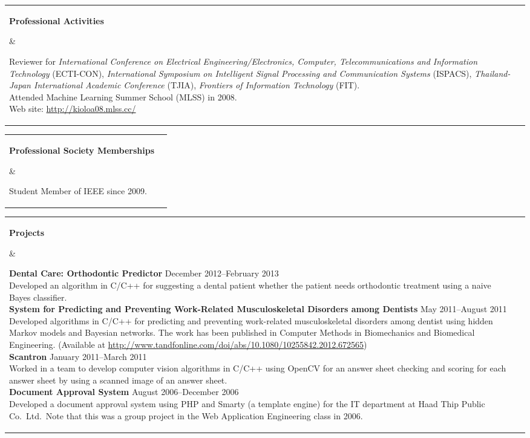 \documentclass[11pt]{article}
\makeatletter
\newcommand{\mysection}[2]{
   \noindent
   \begin{tabular}{@{}ll@{}}
   \parbox[t]{1.0in}{ \raggedright \bf #1 } &
   \parbox[t]{5.0in}{ #2 }\\
   \hspace{0.2in}
   \end{tabular}
}
\makeatother
\begin{document}
\vspace{0.1in}

\mysection{Professional Activities}{
Reviewer for \textit{International Conference on Electrical 
Engineering/Electronics, Computer, Telecommunications and Information 
Technology} (ECTI-CON), \textit{International Symposium on Intelligent 
Signal Processing and Communication Systems} (ISPACS), \textit{Thailand-Japan 
International Academic Conference} (TJIA), \textit{Frontiers of 
Information Technology} (FIT).\\

Attended Machine Learning Summer School (MLSS) in 2008.\\
Web site: \url{http://kioloa08.mlss.cc/}

}

\vspace{0.1in}

\mysection{Professional Society Memberships} {
Student Member of IEEE since 2009.
}

\vspace{0.1in}

\mysection{Projects}{

{\bf Dental Care: Orthodontic Predictor} \hfill December 2012--February 2013\\
Developed an algorithm in C/C++ for suggesting a dental patient whether
the patient needs orthodontic treatment using a naive Bayes classifier.\\
    
{\bf System for Predicting and Preventing Work-Related Musculoskeletal
Disorders among Dentists} \hfill May 2011--August 2011\\
Developed algorithms in C/C++ for predicting and preventing work-related
musculoskeletal disorders among dentist using hidden Markov models and
Bayesian networks. The work has been published in Computer Methods in
Biomechanics and Biomedical Engineering. (Available at
\url{http://www.tandfonline.com/doi/abs/10.1080/10255842.2012.672565})\\

{\bf Scantron} \hfill January 2011--March 2011 \\
Worked in a team to develop computer vision algorithms in C/C++
using OpenCV for an answer sheet checking and scoring for each
answer sheet by using a scanned image of an answer sheet.\\

{\bf Document Approval System} \hfill August 2006--December 2006\\
Developed a document approval system using PHP and Smarty (a template
engine) for the IT department at Haad Thip Public Co.\ Ltd.\ Note
that this was a group project in the Web Application Engineering
class in 2006.
}
\end{document}
